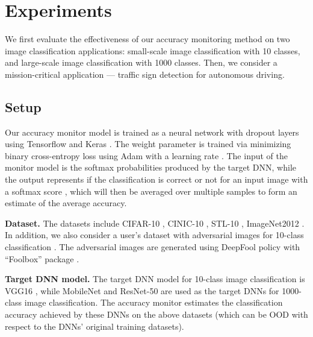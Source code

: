 \documentclass{article}
\newcommand{\zhihui}[1]{{\color{black}{#1}}}
\begin{document}
\section{Experiments}\label{sec:experiment}
We first evaluate
the effectiveness of our accuracy monitoring method
on two image classification applications:  small-scale  image classification with 10 classes, and large-scale  image classification with 1000 classes. Then, we consider a mission-critical application --- traffic sign detection for autonomous driving.

\subsection{Setup}

Our accuracy monitor model is trained as a neural network with dropout layers using Tensorflow  and Keras \cite{tensorflow_2016}. The weight parameter  is trained via minimizing binary cross-entropy loss using Adam \cite{adam_sgd_2014} with a learning rate .
The input of the monitor model  is the softmax probabilities  produced by the target DNN, while the output represents if
the classification is correct or not for an input image  with a softmax score , which will then be averaged over multiple
samples to form an estimate of the average accuracy.


\textbf{Dataset.} The datasets include CIFAR-10 \cite{cifar10_dataset}, CINIC-10 \cite{cinic10_dataset}, STL-10 \cite{stl10_dataset}, ImageNet2012 \cite{imagenet_2012} \zhihui{and German Traffic Sign Detection (GTSD) \cite{traffic_sign_dataset_IJCNN_2013}}. In addition, we also consider a user's dataset with adversarial images for 10-class classification \zhihui{and GTSD  classification, denoted as AD-10, and GTSD-AD, respectively}. The adversarial images are generated using DeepFool  \cite{deepfool_adversarial_attack_2016} policy with {``Foolbox''} package \cite{fool_box_2017}.

\textbf{Target DNN model.}
The target DNN model for 10-class image classification is VGG16 \cite{vgg_16_2014}, while MobileNet \cite{mobilenets_2017_Howard} and ResNet-50 \cite{resnet50_2016} are used as the target DNNs for 1000-class image classification. \zhihui{The target model for GTSD is a native convolutional neural network (CNN) trained on the GTSD training dataset.} The accuracy monitor estimates the
classification accuracy achieved by these DNNs
on the above datasets
 (which can be OOD with respect
to the DNNs' original training datasets).
\end{document}
